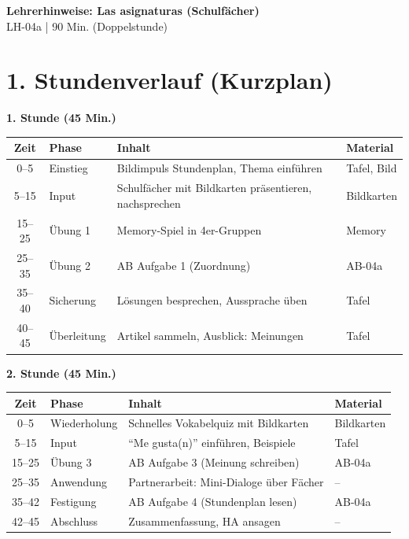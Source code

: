 \documentclass[11pt, a4paper]{article}
\newcommand{\fachfarbe}{spanisch}
\newcommand{\thema}{Las asignaturas (Schulfächer)}
\newcommand{\sequenz}{04}
\newcommand{\block}{a}
\newcommand{\dauer}{90 Min. (Doppelstunde)}
\begin{document}

\begin{center}
    {\Large\bfseries\textcolor{\fachfarbe}{Lehrerhinweise: \thema}}\\[0.3em]
    {\normalsize LH-\sequenz\block{} | \dauer}
\end{center}

\vspace{10pt}


\section*{1. Stundenverlauf (Kurzplan)}

\textbf{1. Stunde (45 Min.)}

\begin{tabularx}{\textwidth}{|c|l|X|l|}
\hline
\textbf{Zeit} & \textbf{Phase} & \textbf{Inhalt} & \textbf{Material} \\
\hline
0--5 & Einstieg & Bildimpuls Stundenplan, Thema einführen & Tafel, Bild \\
\hline
5--15 & Input & Schulfächer mit Bildkarten präsentieren, nachsprechen & Bildkarten \\
\hline
15--25 & Übung 1 & Memory-Spiel in 4er-Gruppen & Memory \\
\hline
25--35 & Übung 2 & AB Aufgabe 1 (Zuordnung) & AB-04a \\
\hline
35--40 & Sicherung & Lösungen besprechen, Aussprache üben & Tafel \\
\hline
40--45 & Überleitung & Artikel sammeln, Ausblick: Meinungen & Tafel \\
\hline
\end{tabularx}

\vspace{1em}

\textbf{2. Stunde (45 Min.)}

\begin{tabularx}{\textwidth}{|c|l|X|l|}
\hline
\textbf{Zeit} & \textbf{Phase} & \textbf{Inhalt} & \textbf{Material} \\
\hline
0--5 & Wiederholung & Schnelles Vokabelquiz mit Bildkarten & Bildkarten \\
\hline
5--15 & Input & ``Me gusta(n)'' einführen, Beispiele & Tafel \\
\hline
15--25 & Übung 3 & AB Aufgabe 3 (Meinung schreiben) & AB-04a \\
\hline
25--35 & Anwendung & Partnerarbeit: Mini-Dialoge über Fächer & -- \\
\hline
35--42 & Festigung & AB Aufgabe 4 (Stundenplan lesen) & AB-04a \\
\hline
42--45 & Abschluss & Zusammenfassung, HA ansagen & -- \\
\hline
\end{tabularx}
\end{document}
